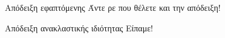 \documentclass{presentation}
\begin{document}
\begin{frame}[label=ΑπόδειξηΕφαπτόμενη]{Απόδειξη εφαπτόμενης}
  Άντε ρε που θέλετε και την απόδειξη!

  \hyperlink{Εφαπτόμενη}{}
\end{frame}

\begin{frame}[label=Απόδειξη]{Απόδειξη ανακλαστικής ιδιότητας}
  Είπαμε!

  \hyperlink{Ιδιότητες}{}
\end{frame}


%
%
%
%
%
%
%
\end{document}
